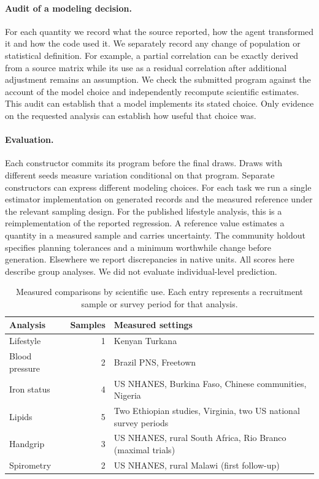 \documentclass[sigconf,anonymous,review]{acmart}
\begin{document}
\paragraph{Audit of a modeling decision.}
For each quantity we record what the source reported, how the agent transformed it and how the code used it. We separately record any change of population or statistical definition. For example, a partial correlation can be exactly derived from a source matrix while its use as a residual correlation after additional adjustment remains an assumption. We check the submitted program against the account of the model choice and independently recompute scientific estimates. This audit can establish that a model implements its stated choice. Only evidence on the requested analysis can establish how useful that choice was.

\paragraph{Evaluation.}
Each constructor commits its program before the final draws. Draws with different seeds measure variation conditional on that program. Separate constructors can express different modeling choices. For each task we run a single estimator implementation on generated records and the measured reference under the relevant sampling design. For the published lifestyle analysis, this is a reimplementation of the reported regression. A reference value estimates a quantity in a measured sample and carries uncertainty. The community holdout specifies planning tolerances and a minimum worthwhile change before generation. Elsewhere we report discrepancies in native units. All scores here describe group analyses. We did not evaluate individual-level prediction.

\begin{table}[t]
\caption{Measured comparisons by scientific use. Each entry represents a recruitment sample or survey period for that analysis.}
\label{tab:scope}
\small\centering
\begin{tabular}{@{}lrp{}@{}}
\toprule
Analysis & Samples & Measured settings\\
\midrule
Lifestyle & 1 & Kenyan Turkana\\
Blood pressure & 2 & Brazil PNS, Freetown\\
Iron status & 4 & US NHANES, Burkina Faso, Chinese communities, Nigeria\\
Lipids & 5 & Two Ethiopian studies, Virginia, two US national survey periods\\
Handgrip & 3 & US NHANES, rural South Africa, Rio Branco (maximal trials)\\
Spirometry & 2 & US NHANES, rural Malawi (first follow-up)\\
\bottomrule
\end{tabular}
\end{table}
\end{document}
